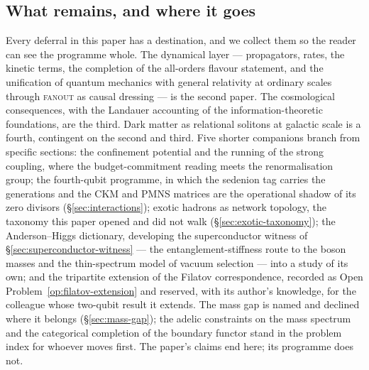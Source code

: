 \subsection{What remains, and where it goes}
\label{sec:what-remains}

Every deferral in this paper has a destination, and we collect them so the reader can see the
programme whole. The dynamical layer --- propagators, rates, the kinetic terms, the completion of
the all-orders flavour statement, and the unification of quantum mechanics with general relativity
at ordinary scales through \textsc{fanout} as causal dressing --- is the second paper. The
cosmological consequences, with the Landauer accounting of the information-theoretic foundations,
are the third. Dark matter as relational solitons at galactic scale is a fourth, contingent on the
second and third. Five shorter companions branch from specific sections: the confinement potential
and the running of the strong coupling, where the budget-commitment reading meets the
renormalisation group; the fourth-qubit programme, in which the sedenion tag carries the
generations and the CKM and PMNS matrices are the operational shadow of its zero divisors
(\S\ref{sec:interactions}); exotic hadrons as network topology, the taxonomy this paper opened and
did not walk (\S\ref{sec:exotic-taxonomy}); the Anderson--Higgs dictionary, developing the
superconductor witness of \S\ref{sec:superconductor-witness} --- the entanglement-stiffness
route to the boson masses and the thin-spectrum model of vacuum selection --- into a study of its
own; and the tripartite extension of the Filatov
correspondence, recorded as Open Problem~\ref{op:filatov-extension} and reserved, with its author's
knowledge, for the colleague whose two-qubit result it extends. The mass gap is named and declined
where it belongs (\S\ref{sec:mass-gap}); the adelic constraints on the mass spectrum and the
categorical completion of the boundary functor stand in the problem index for whoever moves first.
The paper's claims end here; its programme does not.

%      
